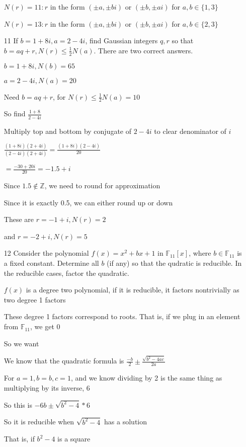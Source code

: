 \documentclass[12pt]{article}
\begin{document}
\begin{itemize}
		$N(r) = 11: r$ in the form $(\pm a, \pm b i)$ or $(\pm b, \pm a i)$ for $a,b \in \{1, 3\}$

		$N(r) = 13: r$ in the form $(\pm a, \pm b i)$ or $(\pm b, \pm a i)$ for $a,b \in \{2, 3\}$

	\item[11] If $b = 1 + 8i, a = 2-4i$, find Gaussian integers $q,r$ so that $b = aq + r, N(r) \leq \frac{1}{2} N(a)$. There are two correct answers.

		$b = 1 + 8i, N(b) = 65$

		$a = 2 - 4i, N(a) = 20$

		Need $b = aq + r$, for $N(r) \leq \frac{1}{2} N(a) = 10$

		So find $\frac{1+8}{2-4i}$

		Multiply top and bottom by conjugate of $2-4i$ to clear denominator of $i$

		$\frac{(1+8i)(2+4i)}{(2-4i)(2+4i)} = \frac{(1+8i)(2-4i)}{20}$

		$=\frac{-30+20i}{20} = -1.5 + i$

		Since $1.5 \not \in \mathbb{Z}$, we need to round for approximation

		Since it is exactly 0.5, we can either round up or down

		These are $r = -1 + i, N(r) = 2$

		and $r = -2 + i, N(r) = 5$

	\item[12] Consider the polynomial $f(x) = x^2 + bx + 1$ in $\mathbb{F}_{11}[x]$, where $b\in \mathbb{F}_{11}$ is a fixed constant. Determine all $b$ (if any) so that the qudratic is reducible. In the reducible cases, factor the quadratic.

		$f(x)$ is a degree two polynomial, if it is reducible, it factors nontrivially as two degree 1 factors

		These degree 1 factors correspond to roots. That is, if we plug in an element from $\mathbb{F}_{11}$, we get 0

		So we want 

		We know that the quadratic formula is $\frac{-b}{2} \pm \frac{\sqrt{b^2 - 4ac}}{2a}$

		For $a = 1, b = b, c = 1$, and we know dividing by 2 is the same thing as multiplying by its inverse, 6

		So this is $-6b \pm \sqrt{b^2 - 4}*6$

		So it is reducible when $\sqrt{b^2 -4}$ has a solution

		That is, if $b^2 -4$ is a square


\end{itemize}
\end{document}
